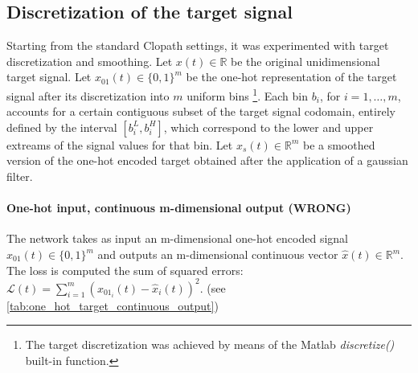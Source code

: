 \documentclass[10pt,a4paper, final]{report} %
\begin{document}
\subsection{Discretization of the target signal}
Starting from the standard Clopath settings, it was experimented with target discretization and smoothing.
Let $x(t) \in \mathbb{R}$ be the original unidimensional target signal. 
Let $x_{01}(t) \in \{0,1\}^m$ be the one-hot representation of the target signal after its discretization into $m$ uniform bins \footnote{The target discretization was achieved by means of the Matlab \textit{discretize()} built-in function.}. Each bin $b_i$, for $i=1, \ldots, m$, accounts for a certain contiguous subset of the target signal codomain, entirely defined by the interval $[b_i^L, b_i^H]$, which correspond to the lower and upper extreams of the signal values for that bin.
Let $x_s(t) \in \mathbb{R}^m$ be a smoothed version of the one-hot encoded target obtained after the application of a gaussian filter.



\paragraph{One-hot input, continuous m-dimensional output (WRONG)}
The network takes as input an m-dimensional one-hot encoded signal $x_{01}(t) \in \{0,1\}^m$ and outputs an m-dimensional continuous vector $\hat{x}(t) \in \mathbb{R}^m$. The loss is computed the sum of squared errors: $\mathcal{L}(t) = \sum_{i=1}^m (x_{01_i}(t) - \hat{x}_i(t))^2$. (see \autoref{tab:one_hot_target_continuous_output})
\end{document}
